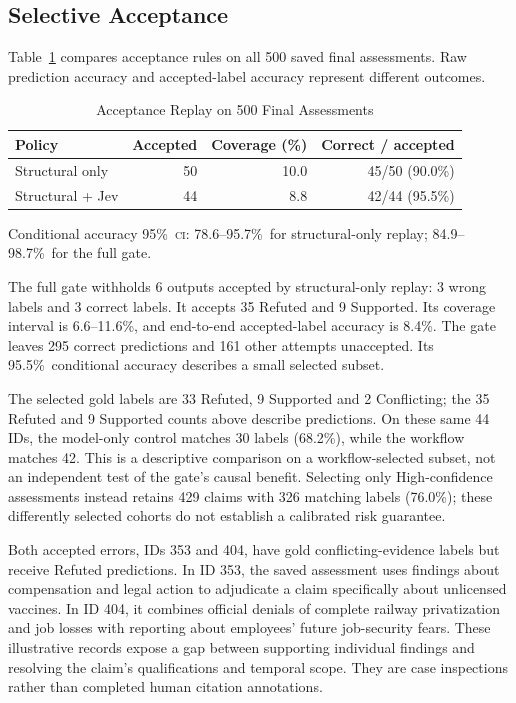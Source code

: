 \documentclass[conference]{IEEEtran}
\newcommand{\CI}{\textsc{ci}}
\newcommand{\pct}{\%}
\begin{document}
\subsection{Selective Acceptance}
Table~\ref{tab:acceptance} compares acceptance rules on all 500 saved final assessments. Raw prediction accuracy and accepted-label accuracy represent different outcomes.

\begin{table}[t]
\caption{Acceptance Replay on 500 Final Assessments}
\label{tab:acceptance}
\centering
\footnotesize
\begin{tabular}{@{}lrrr@{}}
\toprule
Policy & Accepted & Coverage (\pct) & Correct / accepted\\
\midrule
Structural only & 50 & 10.0 & 45/50 (90.0\pct)\\
Structural + Jev & 44 & 8.8 & 42/44 (95.5\pct)\\
\bottomrule
\end{tabular}
\par\smallskip
\parbox{\columnwidth}{\footnotesize Conditional accuracy 95\pct\ \CI: 78.6--95.7\pct\ for structural-only replay; 84.9--98.7\pct\ for the full gate.}
\end{table}

The full gate withholds 6 outputs accepted by structural-only replay: 3 wrong labels and 3 correct labels. It accepts 35 Refuted and 9 Supported. Its coverage interval is 6.6--11.6\pct, and end-to-end accepted-label accuracy is 8.4\pct. The gate leaves 295 correct predictions and 161 other attempts unaccepted. Its 95.5\pct\ conditional accuracy describes a small selected subset.

The selected gold labels are 33 Refuted, 9 Supported and 2 Conflicting; the 35 Refuted and 9 Supported counts above describe predictions. On these same 44 IDs, the model-only control matches 30 labels (68.2\pct), while the workflow matches 42. This is a descriptive comparison on a workflow-selected subset, not an independent test of the gate's causal benefit. Selecting only High-confidence assessments instead retains 429 claims with 326 matching labels (76.0\pct); these differently selected cohorts do not establish a calibrated risk guarantee.

Both accepted errors, IDs 353 and 404, have gold conflicting-evidence labels but receive Refuted predictions. In ID 353, the saved assessment uses findings about compensation and legal action to adjudicate a claim specifically about unlicensed vaccines. In ID 404, it combines official denials of complete railway privatization and job losses with reporting about employees' future job-security fears. These illustrative records expose a gap between supporting individual findings and resolving the claim's qualifications and temporal scope. They are case inspections rather than completed human citation annotations.
\end{document}
